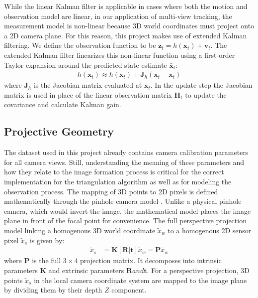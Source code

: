 While the linear Kalman filter is applicable in cases where both the motion and observation model are linear, in our application of multi-view tracking, the measurement model is non-linear because 3D world coordinates must project onto a 2D camera plane. For this reason, this project makes use of extended Kalman filtering. We define the observation function to be $\mathbf{z}_t = h(\mathbf{x}_t) + \mathbf{v}_t$. The extended Kalman filter linearizes this non-linear function using a first-order Taylor expansion around the predicted state estimate $\mathbf{\bar{x}}_t$:
\begin{align*}
h(\mathbf{x}_t) \approx h(\mathbf{\bar{x}}_t) + \mathbf{J}_h (\mathbf{x}_t - \mathbf{\bar{x}}_t)
\end{align*}
where $\mathbf{J}_h$ is the Jacobian matrix evaluated at $\mathbf{\bar{x}}_t$. In the update step the Jacobian matrix is used in place of the linear observation matrix $\mathbf{H}_t$ to update the covariance and calculate Kalman gain.


\subsection{Projective Geometry} \label{calibration}

The dataset used in this project already contains camera calibration parameters for all camera views. Still, understanding the meaning of these parameters and how they relate to the image formation process is critical for the correct implementation for the triangulation algorithm as well as for modeling the observation process. The mapping of 3D points to 2D pixels is defined mathematically through the pinhole camera model \parencite{Lanz2026Notes,hartley2003multiple}. Unlike a physical pinhole camera, which would invert the image, the mathematical model places the image plane in front of the focal point for convenience. The full perspective projection model linking a homogenous 3D world coordinate $\tilde{x}_w$ to a homogenous 2D sensor pixel $\tilde{x}_s$ is given by:
\begin{align*}
  \tilde{x}_s &= \mathbf{K} [\mathbf{R} | \mathbf{t}] \tilde{x}_w = \mathbf{P} \tilde{x}_w
\end{align*}
where $\mathbf{P}$ is the full $3 \times 4$ projection matrix. It decomposes into intrinsic parameters $\mathbf{K}$ and extrinsic parameters $\mathbf{R} and \mathbf{t}$. For a perspective projection, 3D points $\tilde{x}_s$ in the local camera coordinate system are mapped to the image plane by dividing them by their depth $Z$ component.


